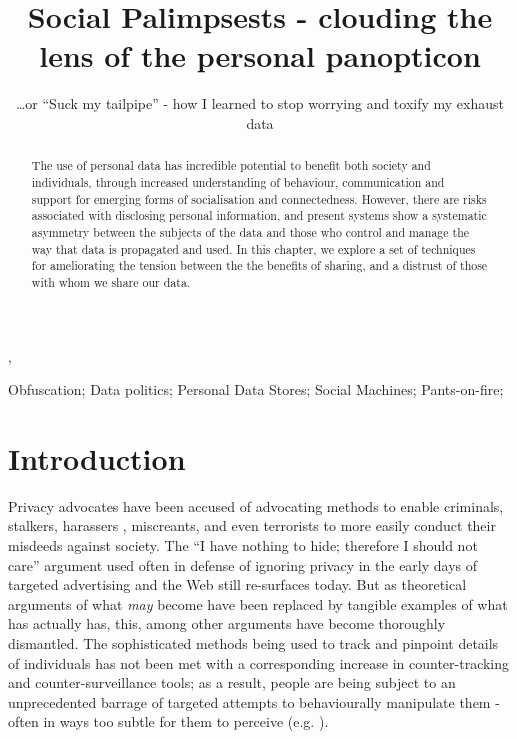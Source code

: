 \documentclass{IOS-Book-Article}     %
\begin{document}
\begin{frontmatter}          %
%
\title{Social Palimpsests - clouding the lens of the personal panopticon}
\subtitle{\ldots or ``Suck my tailpipe'' - how I learned to stop worrying
and toxify my exhaust data}

\author[A]{ },
\author[B]{ }
\author[B]{ }
\address[A]{Centre for Intelligent Systems and Applications,
Department of Informatics, University of Edinburgh}
\address[B]{Southampton}

\begin{abstract}
The use of personal data has incredible potential to benefit both society and
individuals, through increased understanding of behaviour, communication and
support for emerging forms of socialisation and connectedness. However, there
are risks associated with disclosing personal information, and present systems
show a systematic asymmetry between the subjects of the data and those who
control and manage the way that data is propagated and used. In this chapter, we
explore a set of techniques for ameliorating the tension between the 
the benefits of sharing, and a distrust of those with whom we share our data.
\end{abstract}

\begin{keyword}
Obfuscation; Data politics; Personal Data Stores; Social Machines; Pants-on-fire;
\end{keyword}

\end{frontmatter}


\section*{Introduction}


Privacy advocates have been accused of advocating methods to enable criminals,
stalkers, harassers \cite{}, miscreants, and even terrorists \cite{} to more
easily conduct their misdeeds against society. The ``I have nothing to hide;
therefore I should not care'' argument \cite{} used often in defense of ignoring
privacy in the early days of targeted advertising and the Web still re-surfaces
today. But as theoretical arguments of what \emph{may} become have been replaced
by tangible examples of what has actually has, this, among other arguments have
become thoroughly dismantled.  The sophisticated methods being used to track and
pinpoint details of individuals has not been met with a corresponding increase
in counter-tracking and counter-surveillance tools; as a result, people are
being subject to an unprecedented barrage of targeted attempts to behaviourally
manipulate them - often in ways too subtle for them to perceive (e.g.
\cite{facebookstudy}).           
\end{document}
